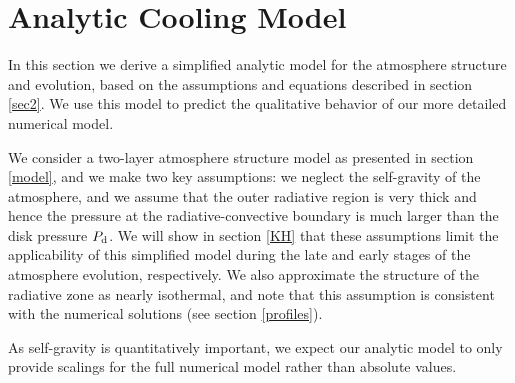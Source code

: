 \documentclass[apj]{emulateapj}
\newcommand{\App}[1]{Appendix~\ref{#1}}
\newcommand{\di}{_{\rm d}}
\begin{document}
%
%
%




\section{Analytic Cooling Model}
\label{analytic}

In this section we derive a simplified analytic model for the atmosphere structure and evolution, based on the assumptions and equations described in section \ref{sec2}. We use this model to predict the qualitative behavior of our more detailed numerical model. %

We consider a two-layer atmosphere structure model as presented in section \ref{model}, and we make two key assumptions: we neglect the self-gravity of the atmosphere, and we assume that the outer radiative region is very thick and hence the pressure at the radiative-convective boundary is much larger than the disk pressure $P\di$. We will show in section \ref{KH} that these assumptions limit the applicability of this simplified model during the late and early stages of the atmosphere evolution, respectively. We also approximate the structure of the radiative zone as nearly isothermal, and note that this assumption is consistent with the numerical solutions (see section \ref{profiles}). 

As self-gravity is quantitatively important, we expect our analytic model to only provide scalings for the full numerical model rather than absolute values.


\end{document}
